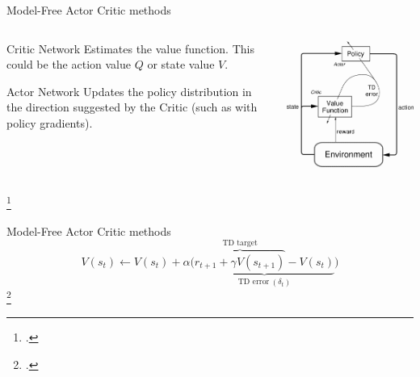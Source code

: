 \documentclass[aspectratio=169]{beamer}
\begin{document}
\begin{frame}{Model-Free Actor Critic methods}
	\begin{columns}
		\begin{column}{0.5\linewidth}
			\begin{exampleblock}{Critic Network}
				Estimates the value function. This could be the action value $Q$ or state value $V$.
			\end{exampleblock}
			\begin{exampleblock}{Actor Network}
				Updates the policy distribution in the direction suggested by the Critic (such as with policy gradients).
			\end{exampleblock}
		\end{column}
		\begin{column}{0.5\linewidth}
			\centering
			\includegraphics[width=0.8\linewidth]{img/actor_critic.png}
		\end{column}
	\end{columns}
	\footcite*{sutton2018reinforcement}

\end{frame}


\begin{frame}{Model-Free Actor Critic methods}
	\Large
	\begin{equation}\label{eq:tdlearning}
		V(s_t) \leftarrow V(s_t) + \alpha \big(\underbrace{\overbrace{r_{t+1} + \gamma V(s_{t+1})}^{\text{TD target}}- V(s_t)}_{\text{TD error} \ (\delta_t)}\big)
	\end{equation}
	\footcite*{sutton2018reinforcement}

\end{frame}
\end{document}
